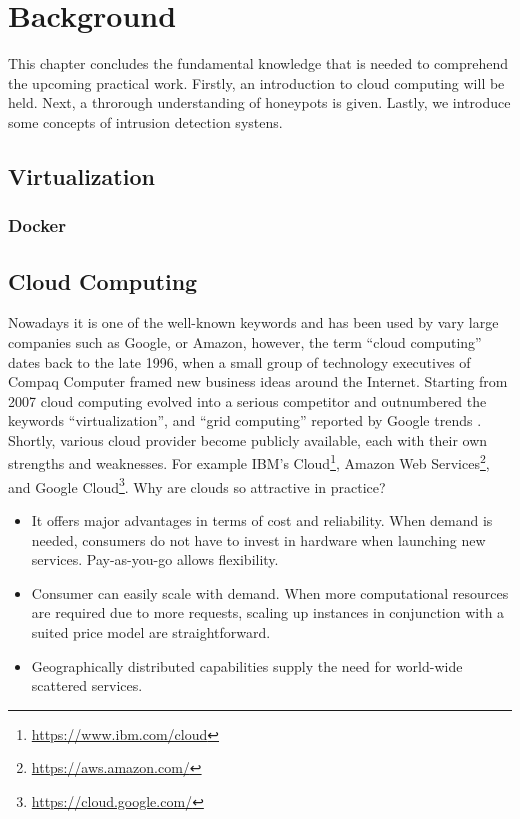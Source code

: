 \chapter{Background}

This chapter concludes the fundamental knowledge that is needed to comprehend the upcoming practical work. Firstly, an introduction to cloud computing will be held. Next, a throrough understanding of honeypots is given. Lastly, we introduce some concepts of intrusion detection systens.

\section{Virtualization}

\subsection{Docker}

\section{Cloud Computing}

Nowadays it is one of the well-known keywords and has been used by vary large companies such as Google, or Amazon, however, the term \enquote{cloud computing} dates back to the late 1996, when a small group of technology executives of Compaq Computer framed new business ideas around the Internet.\cite{regalado2020} Starting from 2007 cloud computing evolved into a serious competitor and outnumbered the keywords \enquote{virtualization}, and \enquote{grid computing} reported by Google trends \cite{Wang2010}. Shortly, various cloud provider become publicly available, each with their own strengths and weaknesses. For example IBM's Cloud\footnote{\url{https://www.ibm.com/cloud}}, Amazon Web Services\footnote{\url{https://aws.amazon.com/}}, and Google Cloud\footnote{\url{https://cloud.google.com/}}. Why are clouds so attractive in practice?

\begin{itemize}
    \item It offers major advantages in terms of cost and reliability. When demand is needed, consumers do not have to invest in hardware when launching new services. Pay-as-you-go allows flexibility.
    \item Consumer can easily scale with demand. When more computational resources are required due to more requests, scaling up instances in conjunction with a suited price model are straightforward.
    \item Geographically distributed capabilities supply the need for world-wide scattered services.
\end{itemize}

